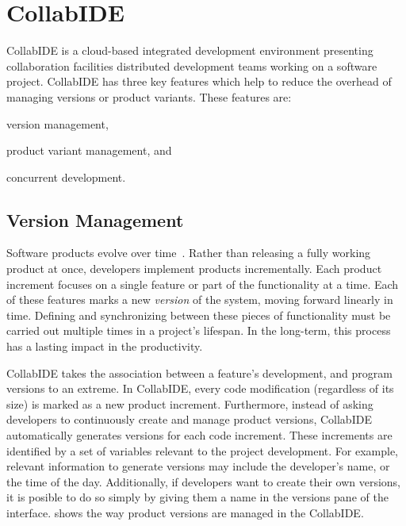 
\section{CollabIDE}
\label{sec:collab-ide}

CollabIDE is a cloud-based integrated development environment presenting collaboration facilities 
distributed development teams working on a software project. CollabIDE has three key features which 
help to reduce the overhead of managing versions or product variants. These features are:
\begin{enumerate*}[label=(\arabic*)] 
\item version management, 
\item product variant management, and 
\item concurrent development.
\end{enumerate*}

\subsection{Version Management}
Software products evolve over time~\cite{lehman02}. Rather than releasing a fully working product at 
once, developers implement products incrementally. Each product increment focuses on a single 
feature or part of the functionality at a time. Each of these features marks a new \emph{version} of the 
system, moving forward linearly in time. Defining and synchronizing between these pieces of 
functionality must be carried out multiple times in a project's lifespan. In the long-term, this process 
has a lasting impact in the productivity.

CollabIDE takes the association between a feature's development, and program versions to an 
extreme. In CollabIDE, every code modification (regardless of its size) is marked as a new product 
increment. Furthermore, instead of asking developers to continuously create and manage product 
versions, CollabIDE automatically generates versions for each code increment. These increments are 
identified by a set of variables relevant to the project development. For example, relevant information 
to generate versions may include the developer's name, or the time of the day. Additionally, if 
developers want to create their own versions, it is posible to do so simply by giving them a name in 
the versions pane of the interface.  shows the way product versions are 
managed in the CollabIDE. 

